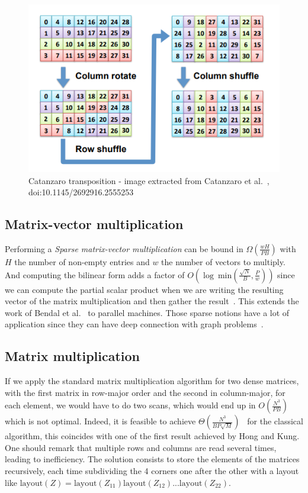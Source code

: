 \begin{figure}[!htb]
    \centering
    \includegraphics[width=0.8\linewidth]{Chapters/GPU/Algorithms/Transposition.png} 
    \caption{Catanzaro transposition - image extracted from Catanzaro et al.~\cite{nobile2014cutauleaping}, doi:10.1145/2692916.2555253}
\end{figure}

\subsection{Matrix-vector multiplication}

Performing a \textit{Sparse matrix-vector multiplication} can be bound in $\Omega(\frac{wH}{PB})$ with $H$ the number of non-empty entries and $w$ the number of vectors to multiply. And computing the bilinear form adds a factor of $O(\log ~ \text{min}(\frac{\sqrt{N}}{B}, \frac{P}{w}))$ since we can compute the partial scalar product when we are writing the resulting vector of the matrix multiplication and then gather the result~\cite{greiner2012sparse}. This extends the work of Bendal et al.~\cite{bender2010optimal} to parallel machines. Those sparse notions have a lot of application since they can have deep connection with graph problems~\cite{yang2015fast}.

\subsection{Matrix multiplication}

If we apply the standard matrix multiplication algorithm for two dense matrices, with the first matrix in row-major order and the second in column-major, for each element, we would have to do two scans, which would end up in $O(\frac{N^{3}}{PB})$ which is not optimal. Indeed, it is feasible to achieve $\Theta(\frac{N^{3}}{BP\sqrt{M}})$~\cite{ballard2012graph} for the classical algorithm, this coincides with one of the first result achieved by Hong and Kung. One should remark that multiple rows and columns are read several times, leading to inefficiency. The solution consists to store the elements of the matrices recursively, each time subdividing the 4 corners one after the other with a layout like $\text{layout}(Z) = \text{layout}(Z_{11})\text{layout}(Z_{12}) ... \text{layout}(Z_{22})$.

